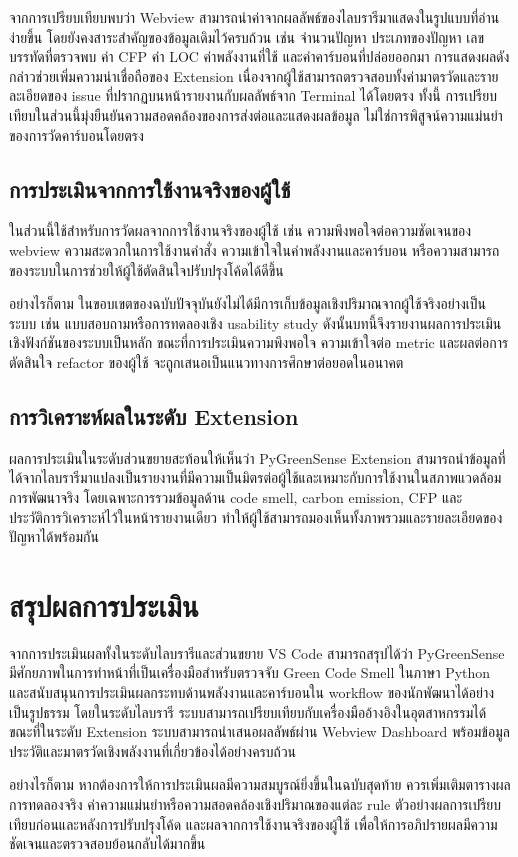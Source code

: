 จากการเปรียบเทียบพบว่า Webview สามารถนำค่าจากผลลัพธ์ของไลบรารีมาแสดงในรูปแบบที่อ่านง่ายขึ้น โดยยังคงสาระสำคัญของข้อมูลเดิมไว้ครบถ้วน เช่น จำนวนปัญหา ประเภทของปัญหา เลขบรรทัดที่ตรวจพบ ค่า CFP ค่า LOC ค่าพลังงานที่ใช้ และค่าคาร์บอนที่ปล่อยออกมา การแสดงผลดังกล่าวช่วยเพิ่มความน่าเชื่อถือของ Extension เนื่องจากผู้ใช้สามารถตรวจสอบทั้งค่ามาตรวัดและรายละเอียดของ issue ที่ปรากฏบนหน้ารายงานกับผลลัพธ์จาก Terminal ได้โดยตรง ทั้งนี้ การเปรียบเทียบในส่วนนี้มุ่งยืนยันความสอดคล้องของการส่งต่อและแสดงผลข้อมูล ไม่ใช่การพิสูจน์ความแม่นยำของการวัดคาร์บอนโดยตรง

\subsection{การประเมินจากการใช้งานจริงของผู้ใช้}

ในส่วนนี้ใช้สำหรับการวัดผลจากการใช้งานจริงของผู้ใช้ เช่น ความพึงพอใจต่อความชัดเจนของ webview ความสะดวกในการใช้งานคำสั่ง ความเข้าใจในค่าพลังงานและคาร์บอน หรือความสามารถของระบบในการช่วยให้ผู้ใช้ตัดสินใจปรับปรุงโค้ดได้ดีขึ้น

อย่างไรก็ตาม ในขอบเขตของฉบับปัจจุบันยังไม่ได้มีการเก็บข้อมูลเชิงปริมาณจากผู้ใช้จริงอย่างเป็นระบบ เช่น แบบสอบถามหรือการทดลองเชิง usability study ดังนั้นบทนี้จึงรายงานผลการประเมินเชิงฟังก์ชันของระบบเป็นหลัก ขณะที่การประเมินความพึงพอใจ ความเข้าใจต่อ metric และผลต่อการตัดสินใจ refactor ของผู้ใช้ จะถูกเสนอเป็นแนวทางการศึกษาต่อยอดในอนาคต

\subsection{การวิเคราะห์ผลในระดับ Extension}

ผลการประเมินในระดับส่วนขยายสะท้อนให้เห็นว่า {\italicfont PyGreenSense Extension} สามารถนำข้อมูลที่ได้จากไลบรารีมาแปลงเป็นรายงานที่มีความเป็นมิตรต่อผู้ใช้และเหมาะกับการใช้งานในสภาพแวดล้อมการพัฒนาจริง โดยเฉพาะการรวมข้อมูลด้าน {\italicfont code smell}, {\italicfont carbon emission}, CFP และประวัติการวิเคราะห์ไว้ในหน้ารายงานเดียว ทำให้ผู้ใช้สามารถมองเห็นทั้งภาพรวมและรายละเอียดของปัญหาได้พร้อมกัน


\section{สรุปผลการประเมิน}

จากการประเมินผลทั้งในระดับไลบรารีและส่วนขยาย VS Code สามารถสรุปได้ว่า {\italicfont PyGreenSense} มีศักยภาพในการทำหน้าที่เป็นเครื่องมือสำหรับตรวจจับ {\italicfont Green Code Smell} ในภาษา Python และสนับสนุนการประเมินผลกระทบด้านพลังงานและคาร์บอนใน {\italicfont workflow} ของนักพัฒนาได้อย่างเป็นรูปธรรม โดยในระดับไลบรารี ระบบสามารถเปรียบเทียบกับเครื่องมืออ้างอิงในอุตสาหกรรมได้ ขณะที่ในระดับ Extension ระบบสามารถนำเสนอผลลัพธ์ผ่าน {\italicfont Webview Dashboard} พร้อมข้อมูลประวัติและมาตรวัดเชิงพลังงานที่เกี่ยวข้องได้อย่างครบถ้วน

อย่างไรก็ตาม หากต้องการให้การประเมินผลมีความสมบูรณ์ยิ่งขึ้นในฉบับสุดท้าย ควรเพิ่มเติมตารางผลการทดลองจริง ค่าความแม่นยำหรือความสอดคล้องเชิงปริมาณของแต่ละ {\italicfont rule} ตัวอย่างผลการเปรียบเทียบก่อนและหลังการปรับปรุงโค้ด และผลจากการใช้งานจริงของผู้ใช้ เพื่อให้การอภิปรายผลมีความชัดเจนและตรวจสอบย้อนกลับได้มากขึ้น
